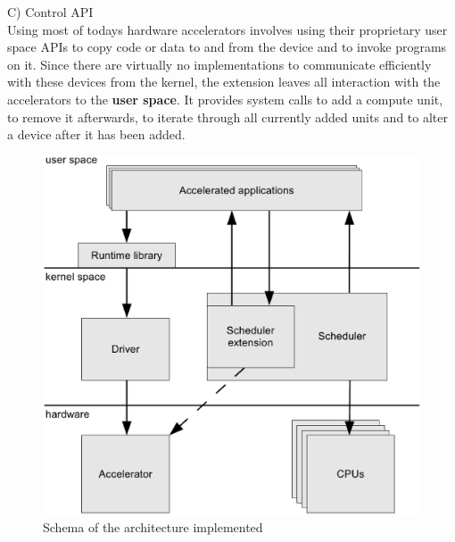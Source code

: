 \documentclass[a4paper,13pt]{article}
\begin{document}
\begin{multicols}{2}
C) Control API\\

Using most of todays hardware accelerators involves using their proprietary user space APIs to copy 
code or data to and from the device and to invoke programs on it. Since there are virtually no 
implementations to communicate efficiently with these devices from the kernel, the extension leaves 
all interaction with the accelerators to the {\bf user space}. It provides system calls to add a compute
unit, to remove it afterwards, to iterate through all currently added units and to alter a device 
after it has been added.
\end{multicols}
    \begin{figure}[H]
        \centering
        \includegraphics[width=13cm]{eps/schema.eps}
        \caption{Schema of the architecture implemented}
    \end{figure}
\end{document}
